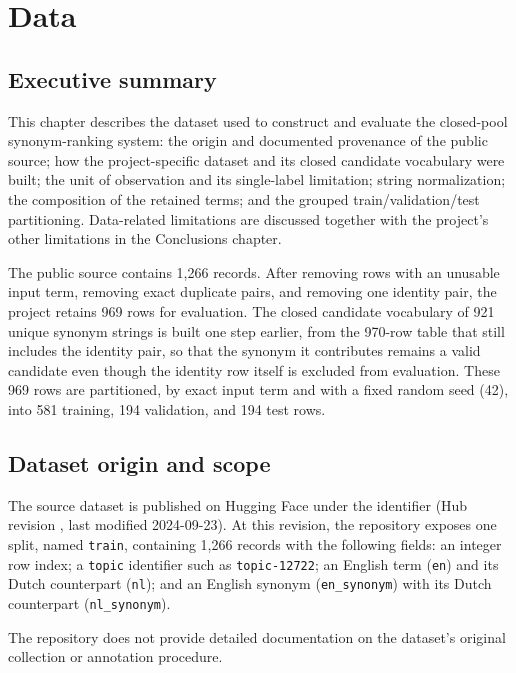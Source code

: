 \chapter{Data}
\label{chap:data}

\section{Executive summary}

This chapter describes the dataset used to construct and evaluate the closed-pool synonym-ranking system: the origin and documented provenance of the public source; how the project-specific dataset and its closed candidate vocabulary were built; the unit of observation and its single-label limitation; string normalization; the composition of the retained terms; and the grouped train/validation/test partitioning. Data-related limitations are discussed together with the project's other limitations in the Conclusions chapter.

The public source contains 1,266 records. After removing rows with an unusable input term, removing exact duplicate pairs, and removing one identity pair, the project retains 969 rows for evaluation. The closed candidate vocabulary of 921 unique synonym strings is built one step earlier, from the 970-row table that still includes the identity pair, so that the synonym it contributes remains a valid candidate even though the identity row itself is excluded from evaluation. These 969 rows are partitioned, by exact input term and with a fixed random seed (42), into 581 training, 194 validation, and 194 test rows.

\section{Dataset origin and scope}

The source dataset is published on Hugging Face under the identifier \texttt{} (Hub revision \texttt{}, last modified 2024-09-23). At this revision, the repository exposes one split, named \texttt{train}, containing 1,266 records with the following fields: an integer row index; a \texttt{topic} identifier such as \texttt{topic-12722}; an English term (\texttt{en}) and its Dutch counterpart (\texttt{nl}); and an English synonym (\texttt{en\_synonym}) with its Dutch counterpart (\texttt{nl\_synonym}).

The repository does not provide detailed documentation on the dataset's original collection or annotation procedure.

